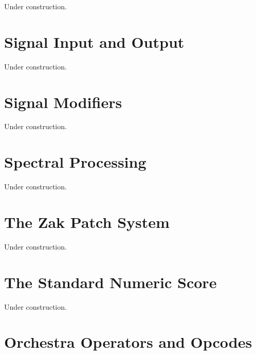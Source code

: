 \documentclass[10pt,letterpaper,onecolumn]{book}
\begin{document}
Under construction.

\chapter{Signal Input and Output}

Under construction.

\chapter{Signal Modifiers}

Under construction.

\chapter{Spectral Processing}

Under construction.

\chapter{The Zak Patch System}

Under construction.

\chapter{The Standard Numeric Score}

Under construction.

\chapter{Orchestra Operators and Opcodes}
\end{document}
